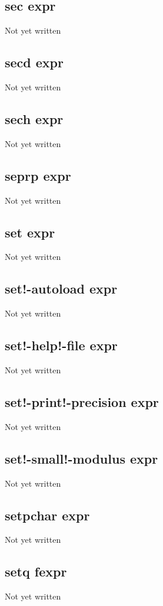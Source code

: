 \documentclass[a4paper,11pt]{article}
\begin{document}
\subsection{\ttfamily sec expr}
Not yet written

\subsection{\ttfamily secd expr}
Not yet written

\subsection{\ttfamily sech expr}
Not yet written

\subsection{\ttfamily seprp expr}
Not yet written

\subsection{\ttfamily set expr}
Not yet written

\subsection{\ttfamily set!-autoload expr}
Not yet written

\subsection{\ttfamily set!-help!-file expr}
Not yet written

\subsection{\ttfamily set!-print!-precision expr}
Not yet written

\subsection{\ttfamily set!-small!-modulus expr}
Not yet written

\subsection{\ttfamily setpchar expr}
Not yet written

\subsection{\ttfamily setq fexpr}
Not yet written
\end{document}
